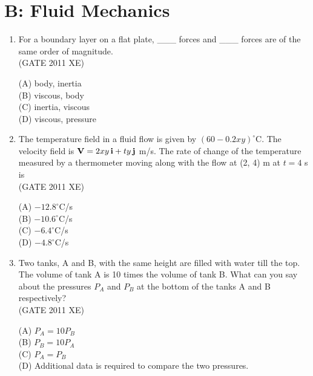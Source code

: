\documentclass[journal,12pt,onecolumn]{IEEEtran}
\begin{document}
\section*{B: Fluid Mechanics}
\bigskip
\begin{enumerate}

\item For a boundary layer on a flat plate, \_\_\_ forces and \_\_\_ forces are of the same order of magnitude.\\

\hfill{(GATE 2011 XE)} \\
\begin{multicols}{4}
(A) body, inertia\\
(B) viscous, body\\
(C) inertia, viscous\\
(D) viscous, pressure
\end{multicols}

\item The temperature field in a fluid flow is given by $(60 - 0.2 x y)^\circ$C. The velocity field is ${\bf V} = 2 x y\, \mathbf{i} + t y\, \mathbf{j}$ m/s. The rate of change of the temperature measured by a thermometer moving along with the flow at (2, 4) m at $t=4$ s is\\

\hfill{(GATE 2011 XE)} \\
\begin{multicols}{4}
(A) $-12.8^\circ$C/s\\
(B) $-10.6^\circ$C/s\\
(C) $-6.4^\circ$C/s\\
(D) $-4.8^\circ$C/s
\end{multicols}

\item Two tanks, A and B, with the same height are filled with water till the top. The volume of tank A is 10 times the volume of tank B. What can you say about the pressures $P_A$ and $P_B$ at the bottom of the tanks A and B respectively?\\

\hfill{(GATE 2011 XE)} \\
\begin{multicols}{2}
(A) $P_A = 10 P_B$\\
(B) $P_B = 10 P_A$\\
(C) $P_A = P_B$\\
(D) Additional data is required to compare the two pressures.
\end{multicols}


\end{enumerate}
\end{document}
